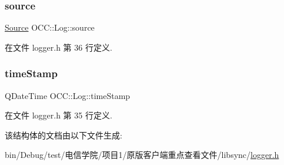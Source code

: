 \subsubsection{\texorpdfstring{source}{source}}
{\footnotesize\ttfamily \hyperlink{struct_o_c_c_1_1_log_a7beafa4ce173549262107825d800c1b4}{Source} O\+C\+C\+::\+Log\+::source}



在文件 logger.\+h 第 36 行定义.

\mbox{\label{struct_o_c_c_1_1_log_a4a1f4cb2f82627aafbc994e9f2062acb}} 
\subsubsection{\texorpdfstring{time\+Stamp}{timeStamp}}
{\footnotesize\ttfamily Q\+Date\+Time O\+C\+C\+::\+Log\+::time\+Stamp}



在文件 logger.\+h 第 35 行定义.



该结构体的文档由以下文件生成\+:\begin{DoxyCompactItemize}
\item 
bin/\+Debug/test/电信学院/项目1/原版客户端重点查看文件/libsync/\hyperlink{logger_8h}{logger.\+h}\end{DoxyCompactItemize}
